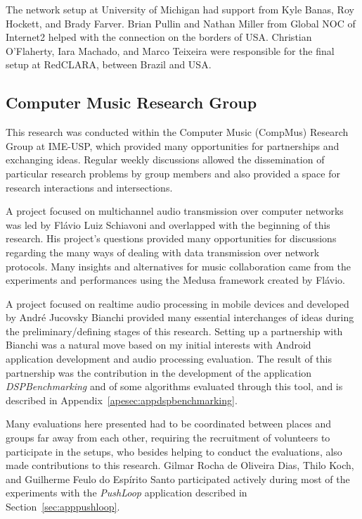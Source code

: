 The network setup at University of Michigan had support from Kyle Banas, Roy Hockett, and Brady Farver.
Brian Pullin and Nathan Miller from Global NOC of Internet2 helped with the connection on the borders of USA.
Christian O'Flaherty, Iara Machado, and Marco Teixeira were responsible for the final setup at RedCLARA, between Brazil and USA.

\subsection*{Computer Music Research Group}
This research was conducted within the Computer Music (CompMus) Research Group at IME-USP, which provided many opportunities for partnerships and exchanging ideas.
Regular weekly discussions allowed the dissemination of particular research problems by group members and also provided a space for research interactions and intersections.

A project focused on multichannel audio transmission over computer networks was led by Flávio Luiz Schiavoni and overlapped with the beginning of this research.
His project's questions provided many opportunities for discussions regarding the many ways of dealing with data transmission over network protocols.
Many insights and alternatives for music collaboration came from the experiments and performances using the Medusa framework created by Flávio.

A project focused on realtime audio processing in mobile devices and developed by André Jucovsky Bianchi provided many essential interchanges of ideas during the preliminary/defining stages of this research.
Setting up a partnership with Bianchi was a natural move based on my initial interests with Android application development and audio processing evaluation.
The result of this partnership was the contribution in the development of the application \textit{DSPBenchmarking} and of some algorithms evaluated through this tool, and is described in Appendix~\ref{apesec:appdspbenchmarking}.

Many evaluations here presented had to be coordinated between places and groups far away from each other, requiring the recruitment of volunteers to participate in the setups, who besides helping to conduct the evaluations, also made contributions to this research.
Gilmar Rocha de Oliveira Dias, Thilo Koch, and Guilherme Feulo do Espírito Santo participated actively during most of the experiments with the \textit{PushLoop} application described in Section~\ref{sec:apppushloop}.

